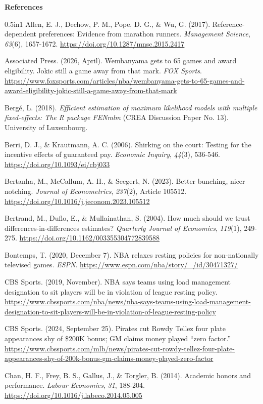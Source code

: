 \documentclass[12pt]{article}
\newcommand{\lone}[1]{\par\medskip\noindent\begin{center}\textbf{#1}\end{center}\par\nopagebreak}
\begin{document}
\clearpage
\begingroup\parindent0pt
\theendnotes
\endgroup
\clearpage
\lone{References}
\begin{hangparas}{0.5in}{1}
Allen, E. J., Dechow, P. M., Pope, D. G., \& Wu, G. (2017). Reference-dependent preferences: Evidence from marathon runners. \emph{Management Science}, \emph{63}(6), 1657-1672. \url{https://doi.org/10.1287/mnsc.2015.2417}

Associated Press. (2026, April). Wembanyama gets to 65 games and award eligibility. Jokic still a game away from that mark. \emph{FOX Sports}. \url{https://www.foxsports.com/articles/nba/wembanyama-gets-to-65-games-and-award-eligibility-jokic-still-a-game-away-from-that-mark}

Bergé, L. (2018). \emph{Efficient estimation of maximum likelihood models with multiple fixed-effects: The R package FENmlm} (CREA Discussion Paper No. 13). University of Luxembourg.

Berri, D. J., \& Krautmann, A. C. (2006). Shirking on the court: Testing for the incentive effects of guaranteed pay. \emph{Economic Inquiry}, \emph{44}(3), 536-546. \url{https://doi.org/10.1093/ei/cbj033}

Bertanha, M., McCallum, A. H., \& Seegert, N. (2023). Better bunching, nicer notching. \emph{Journal of Econometrics}, \emph{237}(2), Article 105512. \url{https://doi.org/10.1016/j.jeconom.2023.105512}

Bertrand, M., Duflo, E., \& Mullainathan, S. (2004). How much should we trust differences-in-differences estimates? \emph{Quarterly Journal of Economics}, \emph{119}(1), 249-275. \url{https://doi.org/10.1162/003355304772839588}

Bontemps, T. (2020, December 7). NBA relaxes resting policies for non-nationally televised games. \emph{ESPN}. \url{https://www.espn.com/nba/story/_/id/30471327/}

CBS Sports. (2019, November). NBA says teams using load management designation to sit players will be in violation of league resting policy. \url{https://www.cbssports.com/nba/news/nba-says-teams-using-load-management-designation-to-sit-players-will-be-in-violation-of-league-resting-policy}

CBS Sports. (2024, September 25). Pirates cut Rowdy Tellez four plate appearances shy of \$200K bonus; GM claims money played ``zero factor.'' \url{https://www.cbssports.com/mlb/news/pirates-cut-rowdy-tellez-four-plate-appearances-shy-of-200k-bonus-gm-claims-money-played-zero-factor}

Chan, H. F., Frey, B. S., Gallus, J., \& Torgler, B. (2014). Academic honors and performance. \emph{Labour Economics}, \emph{31}, 188-204. \url{https://doi.org/10.1016/j.labeco.2014.05.005}


\end{hangparas}
\end{document}
